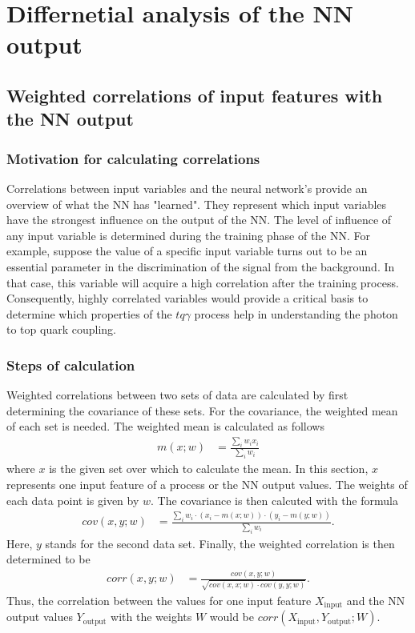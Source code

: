 \chapter{Differnetial analysis of the NN output}
\section{Weighted correlations of input features with the NN output}

\subsection{Motivation for calculating correlations}
Correlations between input variables and the neural network's provide an overview of what the NN has "learned". 
They represent which input variables have the strongest influence on the output of the NN. 
The level of influence of any input variable is determined during the training phase of the NN. For example, suppose the value of a specific input variable turns out to be an essential parameter in the discrimination of the signal from the background. 
In that case, this variable will acquire a high correlation after the training process. 
Consequently, highly correlated variables would provide a critical basis to determine which properties of the $tq\gamma$ process help in understanding the photon to top quark coupling.  \\

\subsection{Steps of calculation}

Weighted correlations between two sets of data are calculated by first determining the covariance of these sets. For the covariance, the weighted mean of each set is needed. 
The weighted mean is calculated as follows
\begin{align*}
    m(x;w) &= \frac{\sum_i{w_i x_i}}{\sum_i{ w_i}}
\end{align*}
where $x$ is the given set over which to calculate the mean. In this section, $x$ represents one input feature of a process or the NN output values. The weights of each data point is given by $w$. 
The covariance is then calcuted with the formula 
\begin{align*}
    cov(x,y;w) &= \frac{\sum_i{w_i \cdot (x_i - m(x;w)) \cdot (y_i - m(y;w))}}{\sum_i{w_i}}.
\end{align*}
Here, $y$ stands for the second data set. Finally, the weighted correlation is then determined to be 
\begin{align*}
    corr(x,y;w) &= \frac{cov(x,y;w)}{\sqrt{cov(x,x;w)\cdot cov(y,y;w)}}.
\end{align*}
Thus, the correlation between the values for one input feature $X_\text{input}$ and the NN output values $Y_\text{output}$ with the weights $W$ would be $corr(X_\text{input},Y_\text{output};W)$.

